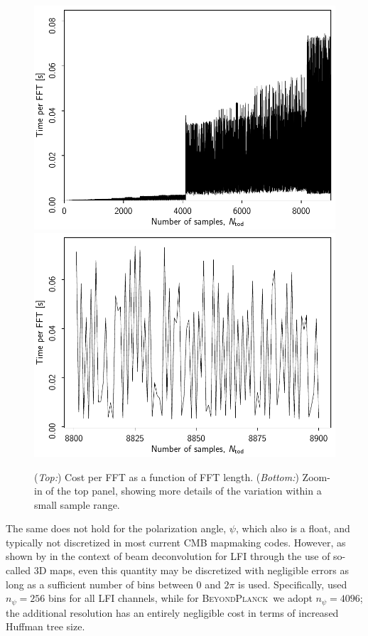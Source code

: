 \documentclass[twocolumn]{aa}
\newcommand{\BP}{\textsc{BeyondPlanck}}
\begin{document}
\begin{figure}[t]
  \center
  \includegraphics[width=\linewidth]{figs/fft_magic.pdf}\\
  \includegraphics[width=\linewidth]{figs/fft_magic_zoom.pdf}
  \caption{(\emph{Top:}) Cost per FFT as a function of FFT
    length. (\emph{Bottom:}) Zoom-in of the top panel, showing more
    details of the variation within a small sample range.
  }\label{fig:fftw}
\end{figure}


The same does not hold for the polarization angle, $\psi$, which also
is a float, and typically not discretized in most current CMB
mapmaking codes. However, as shown by \citet{keihanen2012} in the
context of beam deconvolution for LFI through the use of so-called 3D
maps, even this quantity may be discretized with negligible errors as
long as a sufficient number of bins between 0 and $2\pi$ is
used. Specifically, \citet{keihanen2012} used $n_{\psi}=256$ bins for
all LFI channels, while for \BP\ we adopt $n_{\psi}=4096$; the
additional resolution has an entirely negligible cost in terms of
increased Huffman tree size.
\end{document}
